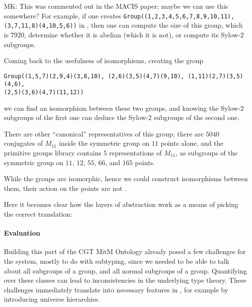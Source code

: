 \begin{oldpart}{MK: This was commented out in the MACIS paper; maybe we can use this somewhere?}
For example, if one creates \lstinline|Group((1,2,3,4,5,6,7,8,9,10,11),(3,7,11,8)(4,10,5,6))|
in \GAP, then one can compute the size of this group, which is $7920$, determine
whether it is abelian (which it is not), or compute its Sylow-$2$ subgroups.

Coming back to the usefulness of isomorphisms, creating the group
\begin{lstlisting}
Group((1,5,7)(2,9,4)(3,8,10), (2,6)(3,5)(4,7)(9,10), (1,11)(2,7)(3,5)(4,6),
(2,5)(3,6)(4,7)(11,12))
\end{lstlisting}
we can find an isomorphism between these two groups, and knowing the Sylow-$2$
subgroups of the first one can deduce the Sylow-$2$ subgroups of the second one.

There are other ``canonical'' representatives of this group; there are $5040$ conjugates
of $M_{11}$ inside the symmetric group on $11$ points alone, and the \GAP primitive groups
library contains $5$ representations of $M_{11}$, as subgroups of the symmetric group on
$11$, $12$, $55$, $66$, and $165$ points.

While the groups are isomorphic, hence we could construct isomorphisms between
them, their action on the points are not .

Here it becomes clear how the layers of abstraction work as a means of picking the correct
translation:

\paragraph{Evaluation}
Building this part of the CGT MitM Ontology already posed a few challenges for the \MMT
system, mostly to do with subtyping, since we needed to be able to talk about all
subgroups of a group, and all normal subgroups of a group. Quantifying over these classes
can lead to inconsistencies in the underlying type theory.  These challenges immediately
translate into necessary features in \OMMT, for example by introducing universe
hierarchies.  
\end{oldpart}



